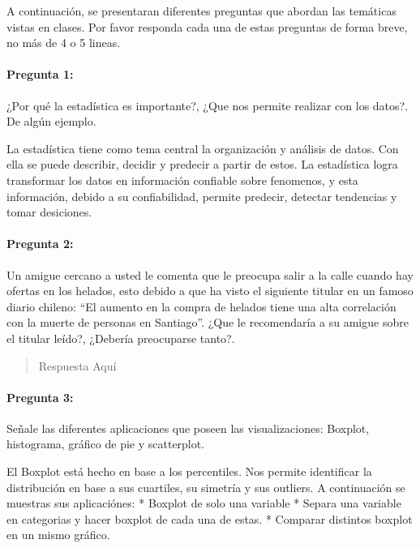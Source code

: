 \documentclass[]{article}
\let\oldparagraph\paragraph
\renewcommand{\paragraph}[1]{\oldparagraph{#1}\mbox{}}
\begin{document}
A continuación, se presentaran diferentes preguntas que abordan las
temáticas vistas en clases. Por favor responda cada una de estas
preguntas de forma breve, no más de 4 o 5 lineas.

\hypertarget{pregunta-1}{%
\paragraph{\texorpdfstring{\textbf{Pregunta
1:}}{Pregunta 1:}}\label{pregunta-1}}

¿Por qué la estadística es importante?, ¿Que nos permite realizar con
los datos?. De algún ejemplo.

La estadística tiene como tema central la organización y análisis de
datos. Con ella se puede describir, decidir y predecir a partir de
estos. La estadística logra transformar los datos en información
confiable sobre fenomenos, y esta información, debido a su
confiabilidad, permite predecir, detectar tendencias y tomar desiciones.

\hypertarget{pregunta-2}{%
\paragraph{\texorpdfstring{\textbf{Pregunta
2:}}{Pregunta 2:}}\label{pregunta-2}}

Un amigue cercano a usted le comenta que le preocupa salir a la calle
cuando hay ofertas en los helados, esto debido a que ha visto el
siguiente titular en un famoso diario chileno: ``El aumento en la compra
de helados tiene una alta correlación con la muerte de personas en
Santiago''. ¿Que le recomendaría a su amigue sobre el titular leído?,
¿Debería preocuparse tanto?.

\begin{quote}
Respuesta Aquí
\end{quote}

\hypertarget{pregunta-3}{%
\paragraph{\texorpdfstring{\textbf{Pregunta
3:}}{Pregunta 3:}}\label{pregunta-3}}

Señale las diferentes aplicaciones que poseen las visualizaciones:
Boxplot, histograma, gráfico de pie y scatterplot.

El Boxplot está hecho en base a los percentiles. Nos permite identificar
la distribución en base a sus cuartiles, su simetría y sus outliers. A
continuación se muestras sus aplicaciónes: * Boxplot de solo una
variable * Separa una variable en categorias y hacer boxplot de cada una
de estas. * Comparar distintos boxplot en un mismo gráfico.
\end{document}
